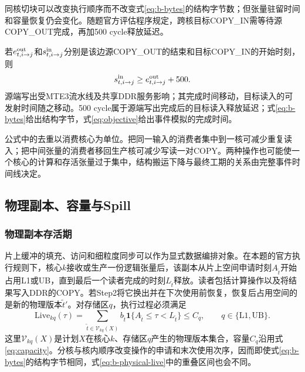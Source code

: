 同核切块可以改变执行顺序而不改变式\eqref{eq:b-bytes}的结构字节数；但张量驻留时间和容量恢复仍会变化。随题官方评估程序规定，跨核目标COPY\_IN需等待源COPY\_OUT完成，再加500 cycle释放延迟。

若$e^{\rm out}_{t,i\to j}$和$s^{\rm in}_{t,i\to j}$分别是该边源COPY\_OUT的结束和目标COPY\_IN的开始时刻，则
\begin{equation}
s^{\rm in}_{t,i\to j}\ge e^{\rm out}_{t,i\to j}+500.
\label{eq:b-copy-release}
\end{equation}
源端写出受MTE3流水线及共享DDR服务影响；其完成时间移动，目标读入的可发射时间随之移动。500 cycle属于源端写出完成后的目标读入释放延迟；式\eqref{eq:b-bytes}给出结构字节，式\eqref{eq:objective}给出事件模拟的完成时间。

公式中的去重以消费核心为单位。把同一输入的消费者集中到一核可减少重复读入；把中间张量的消费者移回生产核可减少写读一对COPY。两种操作也可能使一个核心的计算和存活张量过于集中，结构搬运下降与最终工期的关系由完整事件时间线决定。

\subsection{物理副本、容量与Spill}
\subsubsection{物理副本存活期}
片上缓冲的填充、访问和细粒度同步可以作为显式数据编排对象\cite{pellauer2019buffets}。在本题的官方执行规则下，核心$k$接收或生产一份逻辑张量后，该副本从片上空间申请时刻$A_{\tilde t}$开始占用L1或UB，直到最后一个读者完成的时刻$L_{\tilde t}$释放。读者包括计算操作以及将结果写入DDR的COPY。若Step2将它换出并在下次使用前恢复，恢复后占用空间的是新的物理版本$\tilde t'$。对存储区$q$，执行过程必须满足
\begin{equation}
\mathrm{Live}_{kq}(\tau)
=\sum_{\tilde t\in\mathcal V_{kq}(X)}b_{\tilde t}
\mathbf1\{A_{\tilde t}\le\tau<L_{\tilde t}\}
\le C_q,\qquad q\in\{\mathrm{L1},\mathrm{UB}\}.
\label{eq:b-physical-live}
\end{equation}
这里$\mathcal V_{kq}(X)$是计划$X$在核心$k$、存储区$q$产生的物理版本集合，容量$C_q$沿用式\eqref{eq:capacity}。分核与核内顺序改变操作的申请和末次使用次序，因而即使式\eqref{eq:b-bytes}的结构字节相同，式\eqref{eq:b-physical-live}中的重叠区间也会不同。

